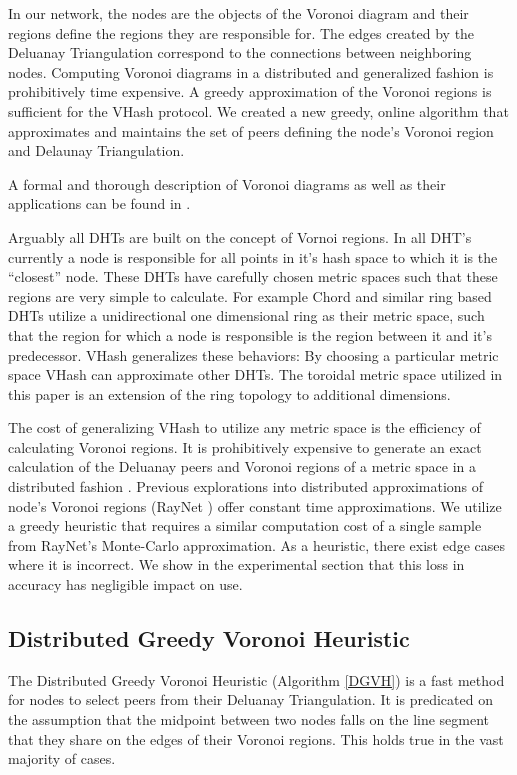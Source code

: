 \documentclass{IEEEtran}
\begin{document}
In our network, the nodes are the objects of the Voronoi diagram and their regions define the regions they are responsible for.  The edges created by the Deluanay Triangulation correspond to the connections between neighboring nodes.  Computing Voronoi diagrams in a distributed and generalized fashion is prohibitively time expensive.
A greedy approximation of the Voronoi regions is sufficient for the VHash protocol.
We created a new greedy, online algorithm that approximates and maintains the set of peers defining the node's Voronoi region and Delaunay Triangulation.




A formal and thorough description of Voronoi diagrams as well as their applications can be found in \cite{aurenhammer1991voronoi}.

Arguably all DHTs are built on the concept of Vornoi regions.
In all DHT's currently a node is responsible for all points in it's hash space to which it is the ``closest'' node.
These DHTs have carefully chosen metric spaces such that these regions are very simple to calculate.
For example Chord and similar ring based DHTs utilize a unidirectional one dimensional ring as their metric space, such that the region for which a node is responsible is the region between it and it's predecessor.
VHash generalizes these behaviors:
By choosing a particular metric space VHash can approximate other DHTs.
The toroidal metric space utilized in this paper is an extension of the ring topology to additional dimensions. 

The cost of generalizing VHash to utilize any metric space is the efficiency of calculating Voronoi regions. 
It is prohibitively expensive to generate an exact calculation of the Deluanay peers and Voronoi regions of a metric space in a distributed fashion \cite{raynet}.  %
Previous explorations into distributed approximations of node's Voronoi regions (RayNet \cite{raynet}) offer constant time approximations.
We utilize a greedy heuristic that requires a similar computation cost of a single sample from RayNet's Monte-Carlo approximation.
As a heuristic, there exist edge cases where it is incorrect.
We show in the experimental section that this loss in accuracy has negligible impact on use.

\subsection{Distributed Greedy Voronoi Heuristic}
The Distributed Greedy Voronoi Heuristic (Algorithm \ref{DGVH}) is a fast method for nodes to select peers from their Deluanay Triangulation.
It is predicated on the assumption that the midpoint between two nodes falls on the line segment that they share on the edges of their Voronoi regions.
This holds true in the vast majority of cases.
\end{document}
